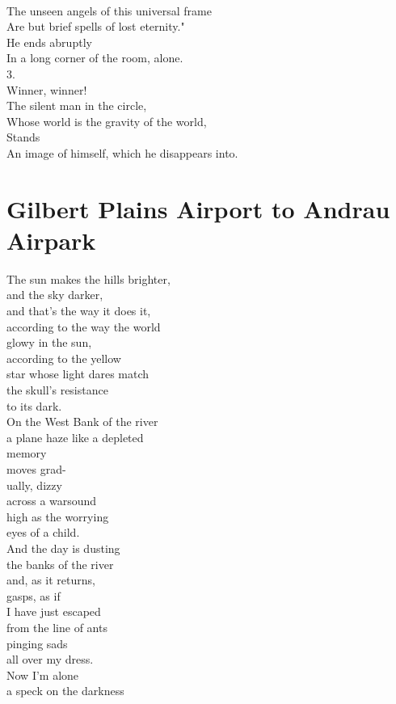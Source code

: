 \documentclass[smalldemyvopaper,11pt,twoside,onecolumn,openright,extrafontsizes]{memoir}
\begin{document}
\\The unseen angels of this universal frame
\\Are but brief spells of lost eternity."
\\He ends abruptly
\\In a long corner of the room, alone.
\\3.
\\Winner, winner!
\\The silent man in the circle,
\\Whose world is the gravity of the world,
\\Stands
\\An image of himself, which he disappears into.



\chapter{Gilbert Plains Airport to Andrau Airpark}
The sun makes the hills brighter,
\\and the sky darker,
\\and that's the way it does it,
\\according to the way the world
\\glowy in the sun,
\\according to the yellow
\\star whose light dares match
\\the skull's resistance
\\to its dark.
\\On the West Bank of the river
\\a plane haze like a depleted
\\memory
\\moves grad-
\\ually, dizzy
\\across a warsound
\\high as the worrying
\\eyes of a child.
\\And the day is dusting
\\the banks of the river
\\and, as it returns,
\\gasps, as if
\\I have just escaped
\\from the line of ants
\\pinging sads
\\all over my dress.
\\Now I'm alone
\\a speck on the darkness
\end{document}
